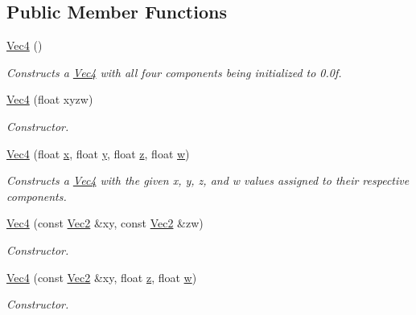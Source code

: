 \subsection*{Public Member Functions}
\begin{DoxyCompactItemize}
\item 
\hyperlink{structgfxmath_1_1_vec4_a86e3b18e88af7f0d85629b01da04f2e9}{Vec4} ()
\begin{DoxyCompactList}\small\item\em Constructs a \hyperlink{structgfxmath_1_1_vec4}{Vec4} with all four components being initialized to 0.\+0f. \end{DoxyCompactList}\item 
\hyperlink{structgfxmath_1_1_vec4_a6ab39b817f6eeac365ee31ddf76635f9}{Vec4} (float xyzw)
\begin{DoxyCompactList}\small\item\em Constructor. \end{DoxyCompactList}\item 
\hyperlink{structgfxmath_1_1_vec4_a77430bab02f56509bb3455863972ad8a}{Vec4} (float \hyperlink{structgfxmath_1_1_vec4_a273598aff75406f0e7a47121b8b06037}{x}, float \hyperlink{structgfxmath_1_1_vec4_a95e0ca27d66d7e0223606c20d326b595}{y}, float \hyperlink{structgfxmath_1_1_vec4_acd626b757468a5ea39f98812a36c4419}{z}, float \hyperlink{structgfxmath_1_1_vec4_adf2769a47b464dfee8d04e191f21701e}{w})
\begin{DoxyCompactList}\small\item\em Constructs a \hyperlink{structgfxmath_1_1_vec4}{Vec4} with the given x, y, z, and w values assigned to their respective components. \end{DoxyCompactList}\item 
\hyperlink{structgfxmath_1_1_vec4_a426ca21da0ff954f7aded1982166f549}{Vec4} (const \hyperlink{structgfxmath_1_1_vec2}{Vec2} \&xy, const \hyperlink{structgfxmath_1_1_vec2}{Vec2} \&zw)
\begin{DoxyCompactList}\small\item\em Constructor. \end{DoxyCompactList}\item 
\hyperlink{structgfxmath_1_1_vec4_af296766fa56d041e2478646f1ee9b081}{Vec4} (const \hyperlink{structgfxmath_1_1_vec2}{Vec2} \&xy, float \hyperlink{structgfxmath_1_1_vec4_acd626b757468a5ea39f98812a36c4419}{z}, float \hyperlink{structgfxmath_1_1_vec4_adf2769a47b464dfee8d04e191f21701e}{w})
\begin{DoxyCompactList}\small\item\em Constructor. \end{DoxyCompactList}\item 

\end{DoxyCompactItemize}
